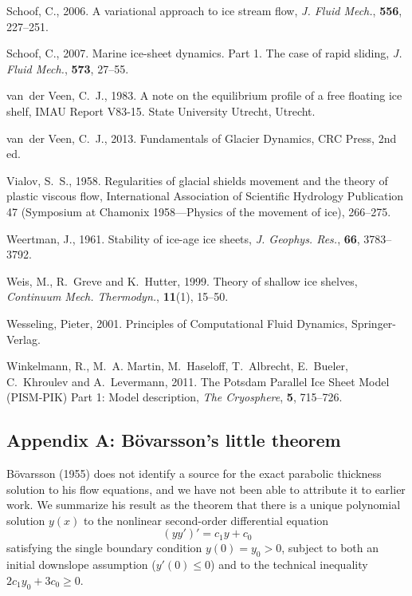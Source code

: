 \documentclass[twocolumn]{igs}
\renewcommand{\dh}{\fontencoding{T1}\selectfont{\symbol{240}}}
\newcommand{\bod}{B\"o\dh varsson\xspace}
\newcommand{\citebod}{B\"o\dh varsson (1955)\nocite{Bodvardsson}\xspace}
\begin{document}
\begin{thebibliography}{29}
Schoof, C., 2006. A variational approach to ice stream flow, {\em J. Fluid
  Mech.\/}, {\bf 556}, 227--251.

Schoof, C., 2007. Marine ice-sheet dynamics. {P}art 1. {T}he case of rapid
  sliding, {\em J. Fluid Mech.\/}, {\bf 573}, 27--55.

van~der Veen, C.~J., 1983. A note on the equilibrium profile of a free floating
  ice shelf, {IMAU} Report V83-15. State University Utrecht, Utrecht.

van~der Veen, C.~J., 2013. Fundamentals of {G}lacier {D}ynamics, CRC Press, 2nd
  ed.

Vialov, S.~S., 1958. Regularities of glacial shields movement and the theory of
  plastic viscous flow, International Association of Scientific Hydrology
  Publication 47 (Symposium at Chamonix 1958---Physics of the movement of ice),
  266--275.

Weertman, J., 1961. Stability of ice-age ice sheets, {\em J. Geophys. Res.\/},
  {\bf 66}, 3783--3792.

Weis, M., R.~Greve and K.~Hutter, 1999. Theory of shallow ice shelves, {\em
  Continuum Mech. Thermodyn.\/}, {\bf 11}(1), 15--50.

Wesseling, Pieter, 2001. Principles of {C}omputational {F}luid {D}ynamics,
  Springer-Verlag.

Winkelmann, R., M.~A. Martin, M.~Haseloff, T.~Albrecht, E.~Bueler, C.~Khroulev
  and A.~Levermann, 2011. The {P}otsdam {P}arallel {I}ce {S}heet {M}odel
  ({PISM-PIK}) {P}art 1: {M}odel description, {\em The Cryosphere\/}, {\bf 5},
  715--726.
\end{thebibliography}

\appendix

\subsection{Appendix A: \bod's little theorem}  \citebod does not identify a source for the exact parabolic thickness solution to his flow equations, and we have not been able to attribute it to earlier work.  We summarize his result as the theorem that there is a unique polynomial solution $y(x)$ to the nonlinear second-order differential equation
\begin{equation}
  (y y')' = c_1 y + c_0  \label{eq:abstractode}
\end{equation}
satisfying the single boundary condition $y(0) = y_0 > 0$, subject to both an initial downslope assumption ($y'(0) \le 0$) and to the technical inequality $2 c_1 y_0 + 3 c_0 \ge 0$.
\end{document}
